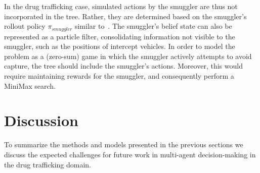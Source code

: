 \documentclass[conference]{IEEEtran}
\begin{document}
In the drug trafficking case, simulated actions by the smuggler are thus not incorporated in the tree. Rather, they are determined based on the smuggler's rollout policy $\pi_{smuggler}$ similar to~\cite{realtime2014}. The smuggler's belief state can also be represented as a particle filter, consolidating information not visible to the smuggler, such as the positions of intercept vehicles. In order to model the problem as a (zero-sum) game in which the smuggler actively attempts to avoid capture, the tree should include the smuggler's actions. Moreover, this would require maintaining rewards for the smuggler, and consequently perform a MiniMax search.

\section{Discussion}
\label{sec:discussion}

To summarize the methods and models presented in the previous sections we discuss the expected challenges for future work in multi-agent decision-making in the drug trafficking domain.
\end{document}
